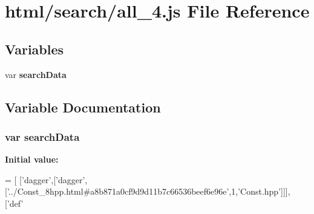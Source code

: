 \section{html/search/all\-\_\-4.js File Reference}
\label{all__4_8js}
\subsection*{Variables}
\begin{DoxyCompactItemize}
\item 
var {\bf search\-Data}
\end{DoxyCompactItemize}


\subsection{Variable Documentation}
\subsubsection[{search\-Data}]{\setlength{\rightskip}{0pt plus 5cm}var search\-Data}\label{all__4_8js_ad01a7523f103d6242ef9b0451861231e}
{\bfseries Initial value\-:}
\begin{DoxyCode}
=
[
  [\textcolor{stringliteral}{'dagger'},[\textcolor{stringliteral}{'dagger'},[\textcolor{stringliteral}{'../Const\_8hpp.html#a8b871a0cf9d9d11b7c66536beef6e96e'},1,\textcolor{stringliteral}{'Const.hpp'}]]],
  [\textcolor{stringliteral}{'def'}
\end{DoxyCode}
